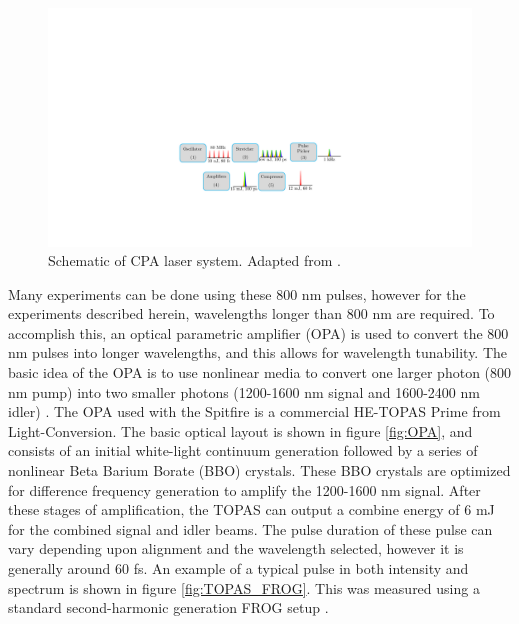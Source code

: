 \begin{figure}
	\centering
	\includegraphics[width=1.0\textwidth]{figures/Beamline/CPA.pdf}
	\caption[Schematic of CPA laser system]{Schematic of CPA laser system. Adapted from \cite{kiesewetterDynamicsNearThresholdAttosecond2019}. }
	\label{fig:CPA}
\end{figure}

Many experiments can be done using these 800 nm pulses, however for the experiments described herein, wavelengths longer than 800 nm are required.  To  accomplish this, an optical parametric amplifier (OPA) is used to convert the 800 nm pulses into longer wavelengths, and this allows for wavelength tunability.  The basic idea of the OPA is to use nonlinear media to convert one larger photon (800 nm pump) into two smaller photons (1200-1600 nm signal and 1600-2400 nm idler) \cite{boydNonlinearOptics2008}.  The OPA used with the Spitfire is a commercial HE-TOPAS Prime from Light-Conversion.  The basic optical layout is shown in figure \ref{fig:OPA}, and consists of an initial white-light continuum generation followed by a series of nonlinear Beta Barium Borate (BBO) crystals.  These BBO crystals are optimized for difference frequency generation to amplify the 1200-1600 nm signal.  After these stages of amplification, the TOPAS can output a combine energy of 6 mJ for the combined signal and idler beams.  The pulse duration of these pulse can vary depending upon alignment and the wavelength selected, however it is generally around 60 fs. An example of a typical pulse in both intensity and spectrum is shown in figure \ref{fig:TOPAS_FROG}.  This was measured using a standard second-harmonic generation FROG setup \cite{trebinoFrequencyresolvedOpticalGating2000}.

